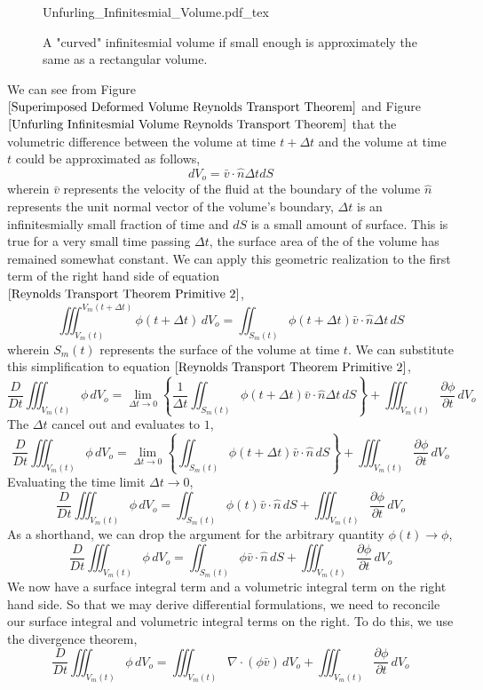 \begin{figure}[H]\centering
\def\svgwidth{400px}
{Unfurling_Infinitesmial_Volume.pdf_tex}
\caption{A "curved" infinitesmial volume if small enough is approximately the same as a rectangular volume.}
\label{Unfurling Infinitesmial Volume Reynolds Transport Theorem}
\end{figure}
We can see from Figure $\ref{Superimposed Deformed Volume Reynolds Transport Theorem}$ and Figure $\ref{Unfurling Infinitesmial Volume Reynolds Transport Theorem}$ that the volumetric difference between the volume at time $t+\Delta t$ and the volume at time $t$ could be approximated as follows,
$$dV_{o} = \bar{v}\cdot \hat{n}\Delta tdS$$
wherein $\bar{v}$ represents the velocity of the fluid at the boundary of the volume $\hat{n}$ represents the unit normal vector of the volume's boundary, $\Delta t$ is an infinitesmially small fraction of time and $dS$ is a small amount of surface.
This is true for a very small time passing $\Delta t$, the surface area of the of the volume has remained somewhat constant. 
We can apply this geometric realization to the first term of the right hand side of equation $\ref{Reynolds Transport Theorem Primitive 2}$,
$$\iiint^{V_{m}(t+\Delta t)}_{V_{m}(t)} \phi(t+\Delta t) \,dV_{o} = \iint^{}_{S_{m}(t)} \phi(t+\Delta t) \bar{v}\cdot \hat{n}\Delta t\,dS$$
wherein $S_{m}(t)$ represents the surface of the volume at time $t$.
We can substitute this simplification to equation $\ref{Reynolds Transport Theorem Primitive 2}$,
$$\frac{D}{Dt}\iiint^{}_{V_{m}(t)} \phi \,dV_{o} = \lim_{\Delta t \to 0}\left\{\frac{1}{\Delta t} \iint^{}_{S_{m}(t)}\phi(t+\Delta t) \bar{v}\cdot\hat{n}\Delta t\,dS\right\} + \iiint^{}_{V_{m}(t)} \frac{\partial \phi}{\partial t} \,dV_{o}$$
The $\Delta t$ cancel out and evaluates to $1$,
$$\frac{D}{Dt}\iiint^{}_{V_{m}(t)} \phi \,dV_{o} = \lim_{\Delta t \to 0}\left\{ \iint^{}_{S_{m}(t)}\phi(t+\Delta t) \bar{v}\cdot\hat{n}\,dS\right\} + \iiint^{}_{V_{m}(t)} \frac{\partial \phi}{\partial t} \,dV_{o}$$
Evaluating the time limit $\Delta t \to 0$,
$$\frac{D}{Dt}\iiint^{}_{V_{m}(t)} \phi \,dV_{o} = \iint^{}_{S_{m}(t)}\phi(t) \bar{v}\cdot\hat{n}\,dS + \iiint^{}_{V_{m}(t)} \frac{\partial \phi}{\partial t} \,dV_{o}$$
As a shorthand, we can drop the argument for the arbitrary quantity $\phi(t) \to \phi$,
$$\frac{D}{Dt}\iiint^{}_{V_{m}(t)} \phi \,dV_{o} = \iint^{}_{S_{m}(t)}\phi \bar{v}\cdot\hat{n}\,dS + \iiint^{}_{V_{m}(t)} \frac{\partial \phi}{\partial t} \,dV_{o}$$
We now have a surface integral term and a volumetric integral term on the right hand side.
So that we may derive differential formulations, we need to reconcile our surface integral and volumetric integral terms on the right.
To do this, we use the divergence theorem,
$$\frac{D}{Dt}\iiint^{}_{V_{m}(t)} \phi \,dV_{o} = \iiint^{}_{V_{m}(t)}\nabla \cdot (\phi \bar{v})\,dV_{o} + \iiint^{}_{V_{m}(t)} \frac{\partial \phi}{\partial t} \,dV_{o}$$

